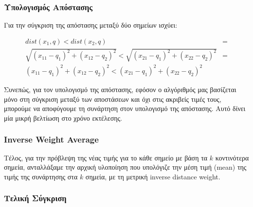 \documentclass[11pt]{scrartcl} %
\begin{document}
\subsubsection{Υπολογισμός Απόστασης}

Για την σύγκριση της απόστασης μεταξύ δύο σημείων ισχύει:

\begin{equation}
    \begin{split}
        dist(x_1, q) < dist(x_2, q) &= \\
        \sqrt{(x_{11} - q_1)^2 + (x_{12} - q_2)^2} < \sqrt{(x_{21} - q_1)^2 + (x_{22} - q_2)^2} &= \\
        {(x_{11} - q_1)^2 + (x_{12} - q_2)^2} < {(x_{21} - q_1)^2 + (x_{22} - q_2)^2}
    \end{split}
\end{equation}

Συνεπώς, για τον υπολογισμό της απόστασης, εφόσον ο αλγόριθμός μας
βασίζεται μόνο στη σύγκριση μεταξύ των αποστάσεων και όχι στις ακριβείς τιμές τους, μπορούμε 
να αποφύγουμε τη συνάρτηση  στον υπολογισμό της απόστασης. 
Αυτό δίνει μία μικρή βελτίωση στο χρόνο εκτέλεσης.

\subsubsection{Inverse Weight Average}

Τέλος, για την πρόβλεψη της νέας τιμής για το κάθε σημείο με βάση τα $k$ κοντινότερα 
σημεία, ανταλλάξαμε την αρχική υλοποίηση που υπολόγιζε την μέση τιμή (mean) της τιμής 
της συνάρτησης στα $k$ σημεία, με τη μετρική inverse distance weight.


\subsubsection{Τελική Σύγκριση}
\end{document}
